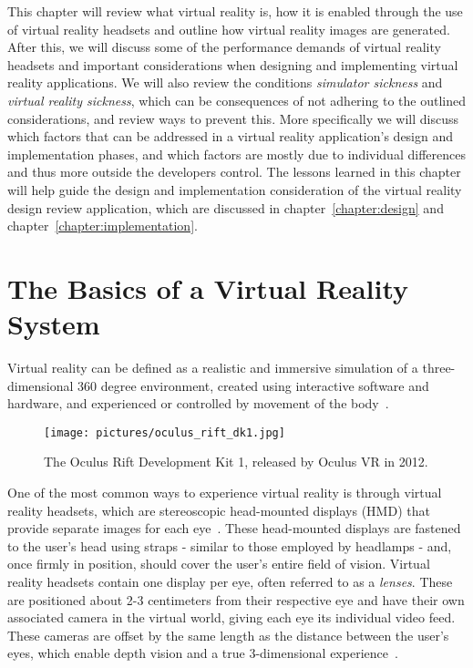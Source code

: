 This chapter will review what virtual reality is, how it is enabled through the use of virtual reality headsets and 
outline how virtual reality images are generated. After this, we will discuss some of the performance demands of virtual reality headsets 
and important considerations when designing and implementing virtual reality applications. 
We will also review the conditions \textit{simulator sickness} and \textit{virtual reality sickness}, which can be consequences of not adhering 
to the outlined considerations, and review ways to prevent this. More specifically we will discuss which factors that can be addressed in a virtual reality application's design and 
implementation phases, and which factors are mostly due to individual differences and thus more outside the developers control. 
The lessons learned in this chapter will help guide the design and implementation consideration of the virtual reality design review application, which 
are discussed in chapter~\ref{chapter:design} and chapter~\ref{chapter:implementation}.


\section{The Basics of a Virtual Reality System}
\label{sec:vr_basics}
Virtual reality can be defined as a realistic and immersive simulation of a three-dimensional 360 degree environment, 
created using interactive software and hardware, and experienced or controlled by movement of the body~\citep{VRS2016}.

\begin{figure}%
	\texttt{[image: pictures/oculus\_rift\_dk1.jpg]}
	\caption[The Oculus Rift Development Kit 1]{The Oculus Rift Development Kit 1, released by Oculus VR in 2012.}
	\label{fig:oculus}
\end{figure}

One of the most common ways to experience virtual reality is through virtual reality headsets, which are stereoscopic head-mounted displays (HMD) 
that provide separate images for each eye~\citep{POLYGON2016}. These head-mounted displays are fastened to the user's head using straps - similar to those employed by 
headlamps - and, once firmly in position, should cover the user's entire field of vision. 
Virtual reality headsets contain one display per eye, often referred to as a \textit{lenses}. These are positioned about 2-3 centimeters from their respective eye and have their own
associated camera in the virtual world, giving each eye its individual video feed. These cameras are offset by the same length as the distance between the user's eyes,
which enable depth vision and a true 3-dimensional experience~\citep{Abrash2012}. 

